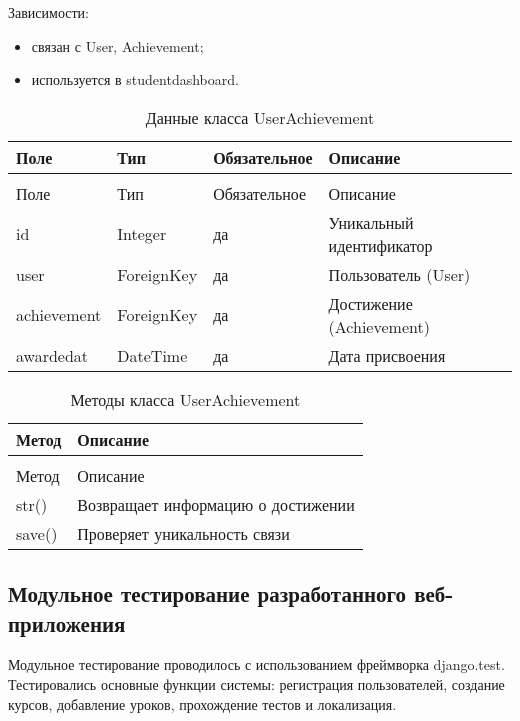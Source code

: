 Зависимости:
	\begin{itemize}
		\item связан с User, Achievement;
		\item используется в studentdashboard.
	\end{itemize}


\begin{xltabular}{\textwidth}{|l|l|l|X|}
	\caption{Данные класса UserAchievement\label{tab:userachievement_attributes}}\\
	\hline
	Поле & Тип & Обязательное & Описание \\ \hline
	\endfirsthead
	\\
	\hline
	Поле & Тип & Обязательное & Описание \\ \hline
	\endhead
	id & Integer & да & Уникальный идентификатор \\ \hline
	user & ForeignKey & да & Пользователь (User) \\ \hline
	achievement & ForeignKey & да & Достижение (Achievement) \\ \hline
	awardedat & DateTime & да & Дата присвоения \\ \hline
\end{xltabular}

\begin{xltabular}{\textwidth}{|l|X|}
	\caption{Методы класса UserAchievement\label{tab:userachievement_methods}}\\
	\hline
	Метод & Описание \\ \hline
	\endfirsthead
	\\
	\hline
	Метод & Описание \\ \hline
	\endhead
	str() & Возвращает информацию о достижении \\ \hline
	save() & Проверяет уникальность связи \\ \hline
\end{xltabular}

\subsection{Модульное тестирование разработанного веб-приложения}

Модульное тестирование проводилось с использованием фреймворка django.test. Тестировались основные функции системы: регистрация пользователей, создание курсов, добавление уроков, прохождение тестов и локализация.

